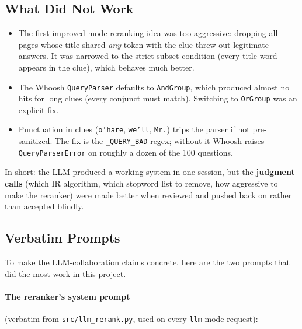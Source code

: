 \documentclass[11pt]{article}
\begin{document}
\subsection{What Did Not Work}

\begin{itemize}
  \item The first improved-mode reranking idea was too aggressive: dropping all
        pages whose title shared \emph{any} token with the clue threw out
        legitimate answers. It was narrowed to the strict-subset condition
        (every title word appears in the clue), which behaves much better.
  \item The Whoosh \texttt{QueryParser} defaults to \texttt{AndGroup}, which
        produced almost no hits for long clues (every conjunct must match).
        Switching to \texttt{OrGroup} was an explicit fix.
  \item Punctuation in clues (\texttt{o'hare}, \texttt{we'll}, \texttt{Mr.})
        trips the parser if not pre-sanitized. The fix is the
        \texttt{\_QUERY\_BAD} regex; without it Whoosh raises
        \texttt{QueryParserError} on roughly a dozen of the 100 questions.
\end{itemize}

In short: the LLM produced a working system in one session, but the
\textbf{judgment calls} (which IR algorithm, which stopword list to remove,
how aggressive to make the reranker) were made better when reviewed and pushed
back on rather than accepted blindly.

\subsection{Verbatim Prompts}

To make the LLM-collaboration claims concrete, here are the two
prompts that did the most work in this project.

\paragraph{The reranker's system prompt} (verbatim from
\texttt{src/llm\_rerank.py}, used on every \texttt{llm}-mode request):
\end{document}
